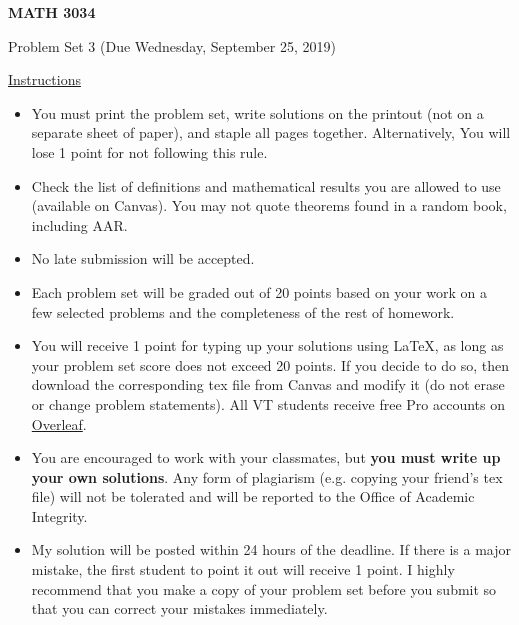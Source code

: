 \documentclass[12pt]{amsart}
\begin{document}

\hfill{}

\vspace{0.3in}
\begin{center}
{\Large{\textbf{MATH 3034}}}

\vspace{0.1in}
{\large{Problem Set 3 (Due Wednesday, September 25, 2019)}}
\end{center}

\vspace{0.3in}
\noindent
\underline{Instructions}
\begin{itemize}
\vspace{0.1in}
\item You must print the problem set, write solutions on the printout (not on a separate sheet of paper), and staple all pages together.  Alternatively,  You will lose 1 point for not following this rule.
\vspace{0.1in}
\item Check the list of definitions and mathematical results you are allowed to use (available on Canvas).  You may not quote theorems found in a random book, including AAR.
\vspace{0.1in}
\item No late submission will be accepted.
\vspace{0.1in}
\item Each problem set will be graded out of 20 points based on your work on a few selected problems and the completeness of the rest of homework.
\vspace{0.1in}
\item You will receive 1 point for typing up your solutions using \LaTeX, as long as your problem set score does not exceed 20 points.  If you decide to do so, then download the corresponding tex file from Canvas and modify it (do not erase or change problem statements).  All VT students receive free Pro accounts on \href{https://www.overleaf.com/edu/vtech}{Overleaf}.
\vspace{0.1in}
\item You are encouraged to work with your classmates, but \textbf{you must write up your own solutions}.  Any form of plagiarism (e.g. copying your friend's tex file) will not be tolerated and will be reported to the Office of Academic Integrity.
\vspace{0.1in}
\item My solution will be posted within 24 hours of the deadline.  If there is a major mistake, the first student to point it out will receive 1 point.  I highly recommend that you make a copy of your problem set before you submit so that you can correct your mistakes immediately.
\end{itemize}
\end{document}
